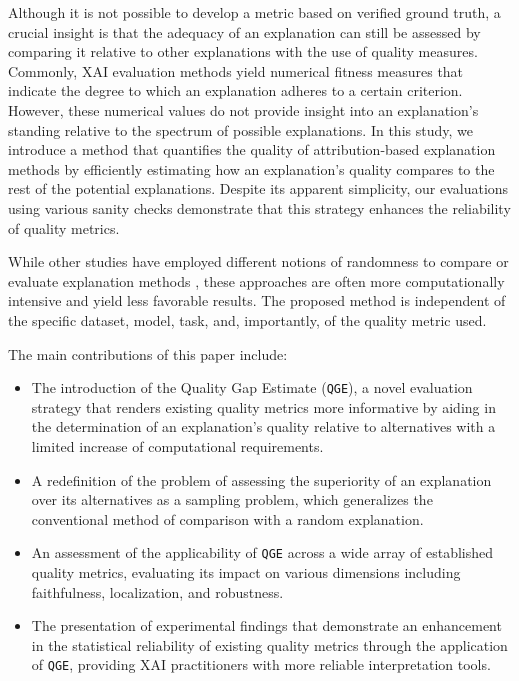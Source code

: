 Although it is not possible to develop a metric based on verified ground truth, a crucial insight is that the adequacy of an explanation can still be assessed by comparing it relative to other explanations with the use of quality measures. Commonly, XAI evaluation methods yield numerical fitness measures that indicate the degree to which an explanation adheres to a certain criterion. However, these numerical values do not provide insight into an explanation's standing relative to the spectrum of possible explanations. In this study, we introduce a method that quantifies the quality of attribution-based explanation methods by efficiently estimating how an explanation's quality compares to the rest of the potential explanations. Despite its apparent simplicity, our evaluations using various sanity checks demonstrate that this strategy enhances the reliability of quality metrics.

While other studies have employed different notions of randomness to compare or evaluate explanation methods \cite{findingrightbommer, samek2015}, these approaches are often more computationally intensive and yield less favorable results. The proposed method is independent of the specific dataset, model, task, and, importantly, of the quality metric used.

The main contributions of this paper include:
\begin{itemize}
    \item The introduction of the Quality Gap Estimate (\texttt{QGE}), a novel evaluation strategy that renders existing quality metrics more informative by aiding in the determination of an explanation’s quality relative to alternatives with a limited increase of computational requirements.
    \item A redefinition of the problem of assessing the superiority of an explanation over its alternatives as a sampling problem, which generalizes the conventional method of comparison with a random explanation.
    \item An assessment of the applicability of \texttt{QGE} across a wide array of established quality metrics, evaluating its impact on various dimensions including faithfulness, localization, and robustness.
    \item The presentation of experimental findings that demonstrate an enhancement in the statistical reliability of existing quality metrics through the application of \texttt{QGE}, providing XAI practitioners with more reliable interpretation tools.
\end{itemize}